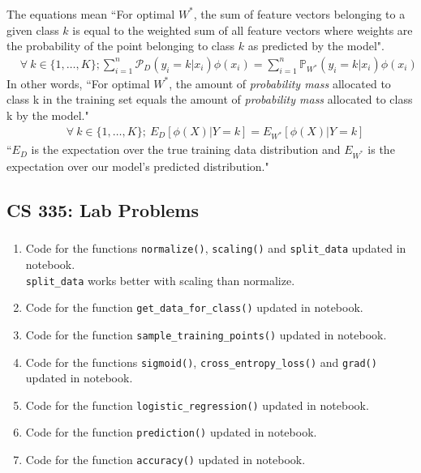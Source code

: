 \documentclass[12pt, fleqn]{article}
\begin{document}
\subsubsection{}
The equations mean ``For optimal $W^*$, the sum of feature vectors belonging to a given class $k$ is equal to the weighted sum of all feature vectors where weights are the probability of the point belonging to class $k$ as predicted by the model".
\begin{equation*}
  \begin{aligned}
     & \forall \ k \in \{1, \dots, K\}; \sum_{i=1}^n \mathcal{P}_D (y_i = k | x_i) \phi(x_i) = \sum_{i=1}^n \mathbb{P}_{W^*} (y_i = k | x_i) \phi(x_i)
  \end{aligned}
\end{equation*}
In other words, ``For optimal $W^*$, the amount of \textit{probability mass} allocated to class k in the training set equals the amount of \textit{probability mass} allocated to class k by the model."
\begin{equation*}
  \begin{aligned}
     & \forall \ k \in \{1, \dots, K\}; \ E_D [\phi(X) | Y = k] = E_{W^*} [\phi(X) | Y = k]
  \end{aligned}
\end{equation*}
``$E_D$ is the expectation over the true training data distribution and $E_{W^*}$ is the expectation over our model’s predicted distribution."


\newpage
\subsection{CS 335: Lab Problems}
\subsubsection{}
\begin{enumerate}[label=(\roman*)]
  \item Code for the functions \verb!normalize()!, \verb!scaling()! and \verb!split_data! updated in notebook. \\
        \verb!split_data! works better with scaling than normalize.
  \item Code for the function \verb!get_data_for_class()! updated in notebook.
  \item Code for the function \verb!sample_training_points()! updated in notebook.
  \item Code for the functions \verb!sigmoid()!, \verb!cross_entropy_loss()! and \verb!grad()! updated in notebook.
  \item Code for the function \verb!logistic_regression()! updated in notebook.
  \item Code for the function \verb!prediction()! updated in notebook.
  \item Code for the function \verb!accuracy()! updated in notebook.
\end{enumerate}
\end{document}
